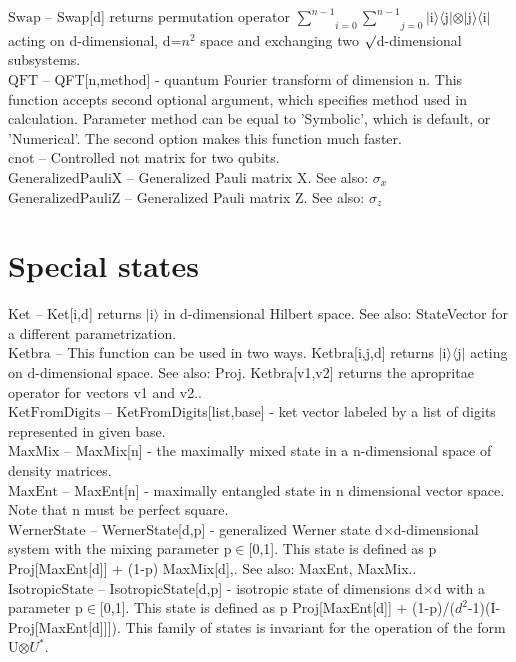 \documentclass[a4paper,10pt]{scrartcl}
\begin{document}
\noindent\textbf{$ \text{Swap} $ }-- Swap[d] returns permutation operator $ \underset{i=0}{\overset{n-1}{ \sum }}\underset{j=0}{\overset{n-1}{ \sum }} $$|$i$\rangle \langle $j$|\otimes |$j$\rangle \langle $i$|$ acting on d-dimensional, d=$ n^2 $ space and exchanging two $\surd $d-dimensional subsystems.$  $\\[8pt]
\noindent\textbf{$ \text{QFT} $ }-- QFT[n,method] - quantum Fourier transform of dimension n. This function accepts second optional argument, which specifies method used in calculation. Parameter method can be equal to 'Symbolic', which is default, or 'Numerical'. The second option makes this function much faster.$  $\\[8pt]
\noindent\textbf{$ \text{cnot} $ }-- Controlled not matrix for two qubits.$  $\\[8pt]
\noindent\textbf{$ \text{GeneralizedPauliX} $ }-- Generalized Pauli matrix X. See also: $ \sigma _x $\\[8pt]
\noindent\textbf{$ \text{GeneralizedPauliZ} $ }-- Generalized Pauli matrix Z. See also: $ \sigma _z $\\[8pt]
\section{Special states}

\noindent\textbf{$ \text{Ket} $ }-- Ket[i,d] returns $|$i$\rangle $ in d-dimensional Hilbert space. See also: StateVector for a different parametrization.$  $\\[8pt]
\noindent\textbf{$ \text{Ketbra} $ }-- This function can be used in two ways. Ketbra[i,j,d] returns $|$i$\rangle \langle $j$|$ acting on d-dimensional space. See also: Proj. Ketbra[v1,v2] returns the apropritae operator for vectors v1 and v2..$  $\\[8pt]
\noindent\textbf{$ \text{KetFromDigits} $ }-- KetFromDigits[list,base] - ket vector labeled by a list of digits represented in given base.$  $\\[8pt]
\noindent\textbf{$ \text{MaxMix} $ }-- MaxMix[n] - the maximally mixed state in a n-dimensional space of density matrices.$  $\\[8pt]
\noindent\textbf{$ \text{MaxEnt} $ }-- MaxEnt[n] - maximally entangled state in n dimensional vector space. Note that n must be perfect square.$  $\\[8pt]
\noindent\textbf{$ \text{WernerState} $ }-- WernerState[d,p] - generalized Werner state d$\times $d-dimensional system with the mixing parameter p$\in $[0,1]. This state is defined as p Proj[MaxEnt[d]] + (1-p) MaxMix[d],. See also: MaxEnt, MaxMix..$  $\\[8pt]
\noindent\textbf{$ \text{IsotropicState} $ }-- IsotropicState[d,p] - isotropic state of dimensions d$\times $d with a parameter p$\in $[0,1]. This state is defined as p Proj[MaxEnt[d]] + (1-p)/($ d^2 $-1)(I-Proj[MaxEnt[d]]]). This family of states is invariant for the operation of the form U$\otimes $$ U^*. $\\[8pt]
\end{document}
